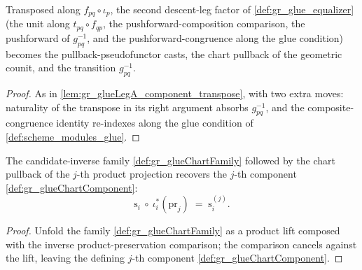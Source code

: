 \begin{lemma}

  \label{lem:gr_glueLegB_component_transpose}
  Transposed along \(f_{pq}\circ\iota_p\), the second descent-leg factor of
  \cref{def:gr_glue_equalizer} (the unit along \(t_{pq}\circ f_{qp}\), the
  pushforward-composition comparison, the pushforward of \(g_{pq}^{-1}\), and the
  pushforward-congruence along the glue condition) becomes the pullback-pseudofunctor
  casts, the chart pullback of the geometric counit, and the transition \(g_{pq}^{-1}\).
\end{lemma}
\begin{proof}
  \leanok
  As in \cref{lem:gr_glueLegA_component_transpose}, with two extra moves: naturality of
  the transpose in its right argument absorbs \(g_{pq}^{-1}\), and the composite-congruence
  identity re-indexes along the glue condition of \cref{def:scheme_modules_glue}.
\end{proof}

\begin{lemma}

  \label{lem:gr_glueChartFamily_pullback_map_pi}
  The candidate-inverse family \cref{def:gr_glueChartFamily} followed by the chart
  pullback of the \(j\)-th product projection recovers the \(j\)-th component
  \cref{def:gr_glueChartComponent}:
  \[
    \mathrm{s}_i\ \circ\ \iota_i^{*}(\mathrm{pr}_j) \;=\; \mathrm{s}_i^{(j)}.
  \]
\end{lemma}
\begin{proof}
  \leanok
  Unfold the family \cref{def:gr_glueChartFamily} as a product lift composed with the
  inverse product-preservation comparison; the comparison cancels against the lift,
  leaving the defining \(j\)-th component \cref{def:gr_glueChartComponent}.
\end{proof}

